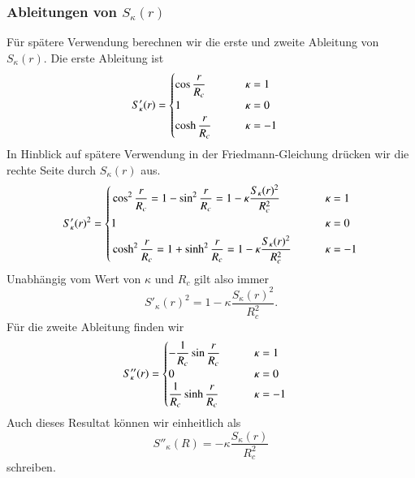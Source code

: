 \subsubsection{Ableitungen von $S_\kappa(r)$}
Für spätere Verwendung berechnen wir die erste und zweite Ableitung 
von $S_\kappa(r)$.
Die erste Ableitung ist
\begin{align*}
S'_\kappa(r)
&=
\begin{cases}
\cos \displaystyle\frac{\mathstrut r}{R_c}&\qquad \kappa= 1\\
1                                         &\qquad \kappa= 0\\
\cosh\displaystyle\frac{\mathstrut r}{R_c}&\qquad \kappa=-1
\end{cases}
\end{align*}
In Hinblick auf spätere Verwendung in der Friedmann-Gleichung drücken wir
die rechte Seite durch $S_\kappa(r)$ aus. 
\begin{equation}
S'_\kappa(r)^2
=
\left\{
\begin{aligned}
&\cos^2\displaystyle\frac{\mathstrut r}{R_c}
=
1-\sin^2\displaystyle\frac{\mathstrut r}{R_c}
=
1-\kappa \frac{S_\kappa(r)^2}{R_c^2}&&\qquad\kappa=1\\
&1&&\qquad\kappa=0\\
&\cosh^2\displaystyle\frac{\mathstrut r}{R_c}
=
1+\sinh^2\displaystyle\frac{\mathstrut r}{R_c}
=
1-\kappa \frac{S_\kappa(r)^2}{R_c^2}&&\qquad\kappa=-1
\end{aligned}
\right.
\end{equation}
Unabhängig vom Wert von $\kappa$ und $R_c$ gilt also immer
\begin{equation}
S'_\kappa(r)^2 = 1-\kappa \frac{S_\kappa(r)^2}{R_c^2}.
\label{skript:robertson:ersteableitung}
\end{equation}
Für die zweite Ableitung finden wir
\begin{align*}
S''_\kappa(r)
&=
\begin{cases}
\displaystyle-\frac{1}{R_c}\sin \frac{\mathstrut r}{R_c}&\qquad \kappa= 1\\
0                                                       &\qquad \kappa= 0\\
\displaystyle \frac{1}{R_c}\sinh\frac{\mathstrut r}{R_c}&\qquad \kappa=-1
\end{cases}
\end{align*}
Auch dieses Resultat können wir einheitlich als
\begin{equation}
S''_\kappa(R)
=
-\kappa\displaystyle \frac{S_\kappa(r)}{R_c^2}
\label{skript:robertson:zweiteableitung}
\end{equation}
schreiben.

